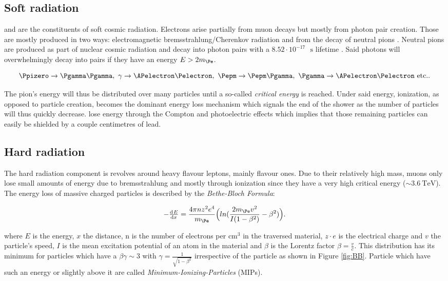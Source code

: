 \subsection{Soft radiation}

\Pgamma and \Pepm are the constituents of soft cosmic radiation. Electrons arise partially from muon decays but mostly from photon pair creation. Those are mostly produced in two ways: electromagnetic bremsstrahlung/Cherenkov radiation and from the decay of neutral pions \Ppizero. Neutral pions are produced as part of nuclear cosmic radiation and decay into photon pairs with a $8.52 \cdot 10^{-17}\text{ }\si{\second}$ lifetime \cite{Tanabashi:2018oca}. Said photons will overwhelmingly decay into \Pepm pairs if they have an energy $E>2m_{\Pe}$.

\begin{equation*}
\Ppizero\rightarrow\Pgamma\Pgamma,\text{   }\gamma\rightarrow\APelectron\Pelectron,\text{   }\Pepm\rightarrow\Pepm\Pgamma,\text{   }\Pgamma\rightarrow\APelectron\Pelectron \text{   etc.}.
\end{equation*}


The pion's energy will thus be distributed over many particles until a so-called \textit{critical energy} is reached. Under said energy, ionization, as opposed to particle creation, becomes the dominant energy loss mechanism which signals the end of the shower as the number of particles will thus quickly decrease. \Pgamma lose energy through the Compton and photoelectric effects which implies that those remaining particles can easily be shielded by a couple centimetres of lead.

\subsection{Hard radiation}

The hard radiation component is revolves around heavy flavour leptons, mainly \Pmu flavour ones. Due to their relatively high mass, muons only lose small amounts of energy due to bremsstrahlung and mostly through ionization since they have a very high critical energy ($\sim \SI{3.6}{\TeV}$). The energy loss of massive charged particles is described by the \textit{Bethe-Bloch Formula}:

\begin{equation}
-\od{E}{x}=\frac{4\pi n z^2 e^4}{m_{\Pe}}\Big(ln(\frac{2m_{\Pe}v^2}{I(1-\beta^2)}-\beta^2)  \Big).
\end{equation}

where $E$ is the energy, $x$ the distance, n is the number of electrons per $\text{cm}^3$ in the traversed material, $z \cdot e$ is the electrical charge and $v$ the particle's speed, $I$ is the mean excitation potential of an atom in the material and $\beta$ is the Lorentz factor $\beta = \frac{v}{c}$. This distribution has its minimum for particles which have a $\beta\gamma \sim 3$ with $\gamma=\frac{1}{\sqrt{1-\beta^2}}$ irrespective of the particle as shown in Figure \ref{fig:BB}. Particle which have such an energy or slightly above it are called \textit{Minimum-Ionizing-Particles} (MIPs).

